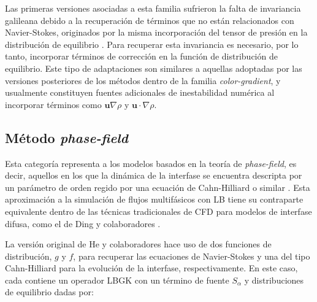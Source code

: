 Las primeras versiones asociadas a esta familia sufrieron la falta de invariancia galileana debido a la recuperaci\'on de t\'erminos que no est\'an relacionados con Navier-Stokes, originados por la misma incorporaci\'on del tensor de presi\'on en la distribuci\'on de equilibrio \cite{kuzmin_multi-relaxation_2008}. Para recuperar esta invariancia es necesario, por lo tanto, incorporar t\'erminos de correcci\'on en la funci\'on de distribuci\'on de equilibrio. Este tipo de adaptaciones son similares a aquellas adoptadas por las versiones posteriores de los m\'etodos dentro de la familia \emph{color-gradient}, y usualmente constituyen fuentes adicionales de inestabilidad num\'erica al incorporar t\'erminos como $\bm{u}\nabla\rho$ y $\bm{u}\cdot\nabla\rho$.


\subsection*{M\'etodo \emph{phase-field}}
Esta categor\'ia representa a los modelos basados en la teor\'ia de \emph{phase-field}, es decir, aquellos en los que la din\'amica de la interfase se encuentra descripta por un par\'ametro de orden regido por una ecuaci\'on de Cahn-Hilliard o similar \cite{jacqmin_calculation_1999}. Esta aproximaci\'on a la simulaci\'on de flujos multif\'asicos con LB tiene su contraparte equivalente dentro de las t\'ecnicas tradicionales de CFD para modelos de interfase difusa, como el de Ding y colaboradores \cite{ding_diffuse_2007}.

La versi\'on original de He y colaboradores \cite{he_lattice_1999} hace uso de dos funciones de distribuci\'on, $g$ y $f$, para recuperar las ecuaciones de Navier-Stokes y una del tipo Cahn-Hilliard para la evoluci\'on de la interfase, respectivamente. En este caso, cada \lbe{} contiene un operador LBGK con un t\'ermino de fuente $S_{\alpha}$ y distribuciones de equilibrio dadas por:

